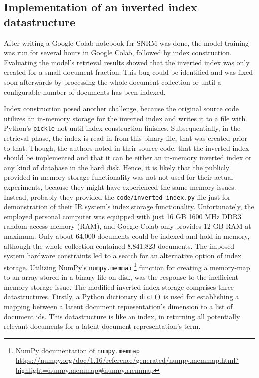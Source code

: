 \subsection{Implementation of an inverted index datastructure}
After writing a Google Colab notebook for SNRM was done, the model training was run for several hours in Google Colab,
    followed by index construction.
Evaluating the model's retrieval results showed that the inverted index was only created for a small document fraction.
This bug could be identified and was fixed soon afterwards by processing the whole document collection or until a
    configurable number of documents has been indexed.

Index construction posed another challenge, because the original source code utilizes an in-memory storage
    for the inverted index and writes it to a file with Python's \texttt{pickle} not until index construction finishes.
Subsequentially, in the retrieval phase, the index is read in from this binary file, that was created prior to that.
Though, the authors noted in their source code, that the inverted index should be implemented and that it can be 
    either an in-memory inverted index or any kind of database in the hard disk.
Hence, it is likely that the publicly provided in-memory storage functionality was not not used for their actual experiments,
    because they might have experienced the same memory issues.
Instead, probably they provided the \verb|code/inverted_index.py| file just for demonstration of their IR system's index
    storage functionality.
Unfortunately, the employed personal computer was equipped with just 16 GB 1600 MHz DDR3 random-access memory (RAM),
    and Google Colab only provides 12 GB RAM at maximum.
Only about 64,000 documents could be indexed and hold in-memory, although the whole collection contained 8,841,823 documents.
The imposed system hardware constraints led to a search for an alternative option of index storage.
Utilizing NumPy's \texttt{numpy.memmap}
    \footnote{NumPy documentation of \texttt{numpy.memmap} \url{https://numpy.org/doc/1.16/reference/generated/numpy.memmap.html?highlight=numpy.memmap\#numpy.memmap}} 
    function for creating a memory-map to an array stored in a binary file on disk, was the response to the 
    inefficient memory storage issue.
The modified inverted index storage comprises three datastructures.
Firstly, a Python dictionary \texttt{dict()} is used for establishing a mapping between a latent document representation's dimension
    to a list of document ids.
This datastructure is like an index, in returning all potentially relevant documents for a latent document representation's term.
